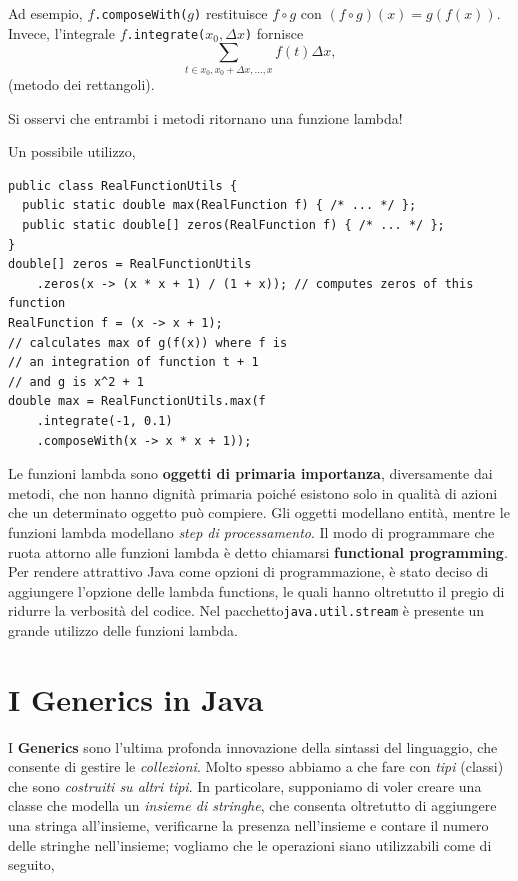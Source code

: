 \documentclass[\fontsizeclass,twocolumn]{\classname}
\theoremstyle{definition}
\theoremstyle{definition}
\begin{document}
Ad esempio, $f$\texttt{.composeWith(}$g$\texttt{)} restituisce $f \circ g$
con $(f \circ g)(x) = g(f(x))$. Invece, l'integrale
$f$\texttt{.integrate(}$x_0, \Delta x$\texttt{)} fornisce $$\sum_{t\in x_0,
x_0+\Delta x, \dots , x} f(t)\Delta x,$$ (metodo dei rettangoli).

Si osservi che entrambi i metodi ritornano una funzione lambda!

Un possibile utilizzo,

\begin{lstlisting}
public class RealFunctionUtils {  
  public static double max(RealFunction f) { /* ... */ };
  public static double[] zeros(RealFunction f) { /* ... */ };  
}
double[] zeros = RealFunctionUtils
    .zeros(x -> (x * x + 1) / (1 + x)); // computes zeros of this function
RealFunction f = (x -> x + 1);
// calculates max of g(f(x)) where f is
// an integration of function t + 1
// and g is x^2 + 1
double max = RealFunctionUtils.max(f
    .integrate(-1, 0.1)
    .composeWith(x -> x * x + 1));
\end{lstlisting}

Le funzioni lambda sono \textbf{oggetti di primaria importanza}, diversamente dai
metodi, che non hanno dignità primaria poiché esistono solo in qualità di azioni
che un determinato oggetto può compiere. Gli oggetti modellano entità, mentre
le funzioni lambda modellano \emph{step di processamento}. Il modo di
programmare che ruota attorno alle funzioni lambda è detto chiamarsi
\textbf{functional programming}. Per rendere attrattivo Java come opzioni di
programmazione, è stato deciso di aggiungere l'opzione delle lambda functions,
le quali hanno oltretutto il pregio di ridurre la verbosità del codice. Nel
pacchetto\texttt{java.util.stream} è presente un grande utilizzo delle funzioni
lambda.

\chapter{I Generics in Java}

I \textbf{Generics} sono l'ultima profonda innovazione della sintassi del
linguaggio, che consente di gestire le \emph{collezioni}. Molto spesso abbiamo
a che fare con \emph{tipi} (classi) che sono \emph{costruiti su altri tipi}. In
particolare, supponiamo di voler creare una classe che modella un \emph{insieme
di stringhe}, che consenta oltretutto di aggiungere una stringa all'insieme,
verificarne la presenza nell'insieme e contare il numero delle stringhe
nell'insieme; vogliamo che le operazioni siano utilizzabili come di seguito,
\end{document}
